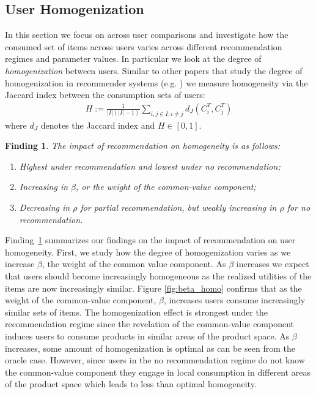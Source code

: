 \documentclass[format=acmsmall, review=false]{acmart}
\newtheorem{finding}{Finding}
\begin{document}
\subsection{User Homogenization}
In this section we focus on across user comparisons and investigate how the consumed set of items across users varies across different recommendation regimes and parameter values. In particular we look at the degree of \textit{homogenization} between users. Similar to other papers that study the degree of homogenization in recommender systems (e.g. \cite{chaney2018algorithmic}) we measure homogeneity via the Jaccard index between the consumption sets of users:
\begin{align*}
H:=\frac{1}{|I|(|I|-1)}\sum_{i,j \in I: i \ne j}d_J(C_i^T,C_j^T)
\end{align*}
where $d_J$ denotes the Jaccard index and $H \in [0,1]$.
\begin{finding}\label{finding_homogeneity}
The impact of recommendation on homogeneity is as follows:
\begin{enumerate}
\item Highest under recommendation and lowest under no recommendation;
\item Increasing in $\beta$, or the weight of the common-value component;
\item Decreasing in $\rho$ for partial recommendation, but weakly increasing in $\rho$ for no recommendation.
\end{enumerate}
\end{finding}
Finding~\ref{finding_homogeneity} summarizes our findings on the impact of recommendation on user homogeneity. First, we study how the degree of homogenization varies as we increase $\beta$, the weight of the common value component. As $\beta$ increases we expect that users should become increasingly homogeneous as the realized utilities of the items are now increasingly similar. Figure \ref{fig:beta_homo} confirms that as the weight of the common-value component, $\beta$, increases users consume increasingly similar sets of items. The homogenization effect is strongest under the recommendation regime since the revelation of the common-value component induces users to consume products in similar areas of the product space. As $\beta$ increases, some amount of homogenization is optimal as can be seen from the oracle case. However, since users in the no recommendation regime do not know the common-value component they engage in local consumption in different areas of the product space which leads to less than optimal homogeneity.
\end{document}

